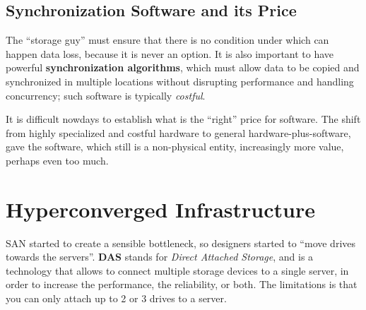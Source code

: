 \subsection{Synchronization Software and its Price}
The ``storage guy'' must ensure that there is no condition under which can happen data loss, because it is never an option. It is also important to have powerful \textbf{synchronization algorithms}, which must allow data to be copied and synchronized in multiple locations without disrupting performance and handling concurrency;
such software is typically \textit{costful}.

It is difficult nowdays to establish what is the ``right'' price for software. The shift from highly specialized and costful hardware to general hardware-plus-software, gave the software, which still is a non-physical entity, increasingly more value, perhaps even too much.


\section{Hyperconverged Infrastructure}
SAN started to create a sensible bottleneck, so designers started to ``move drives towards the servers''.
\textbf{DAS} stands for \textit{Direct Attached Storage}, and is a technology that allows to connect multiple storage devices to a single server, in order to increase the performance, the reliability, or both.
The limitations is that you can only attach up to 2 or 3 drives to a server.

